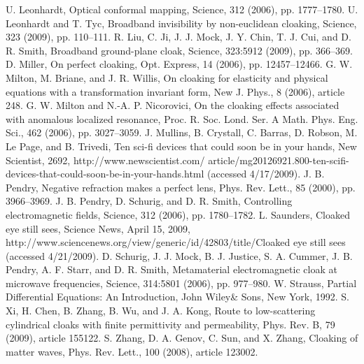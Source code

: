 \documentclass[a4paper, 12pt]{article}
\begin{document}
\begin{thebibliography}{99}
U. Leonhardt, Optical conformal mapping, Science, 312 (2006), 
pp. 1777–1780.
U. Leonhardt and T. Tyc, Broadband invisibility by non-euclidean cloaking,
Science, 323 (2009), pp. 110–111.
R. Liu, C. Ji, J. J. Mock, J. Y. Chin, T. J. Cui, and D. R. Smith, 
Broadband ground-plane cloak, Science, 323:5912 (2009), pp. 366–369.
D. Miller, On perfect cloaking, Opt. Express, 14 (2006), pp. 12457–12466.
G. W. Milton, M. Briane, and J. R. Willis, On cloaking for elasticity and 
physical equations with a transformation invariant form, New J. Phys., 8 (2006), 
article 248.
G. W. Milton and N.-A. P. Nicorovici, On the cloaking effects associated 
with anomalous localized resonance, Proc. R. Soc. Lond. Ser. A Math. Phys. Eng. Sci., 
462 (2006), pp. 3027–3059.
J. Mullins, B. Crystall, C. Barras, D. Robson, M. Le Page, and B. Trivedi, 
Ten sci-fi devices that could soon be in your hands, New Scientist, 2692, 
http://www.newscientist.com/
article/mg20126921.800-ten-scifi-devices-that-could-soon-be-in-your-hands.html 
(accessed 4/17/2009).
J. B. Pendry, Negative refraction makes a perfect lens, Phys. Rev. Lett., 
85 (2000), pp. 3966–3969.
J. B. Pendry, D. Schurig, and D. R. Smith, Controlling electromagnetic 
fields, Science, 312 (2006), pp. 1780–1782.
L. Saunders, Cloaked eye still sees, Science News, April 15, 2009, 
http://www.sciencenews.org/view/generic/id/42803/title/Cloaked eye still sees 
(accessed 4/21/2009).
D. Schurig, J. J. Mock, B. J. Justice, S. A. Cummer, J. B. Pendry, A. F. 
Starr, and D. R. Smith, Metamaterial electromagnetic cloak at microwave frequencies, 
Science, 314:5801 (2006), pp. 977–980.
W. Strauss, Partial Differential Equations: An Introduction, John Wiley\& 
Sons, New York, 1992.
S. Xi, H. Chen, B. Zhang, B. Wu, and J. A. Kong, Route to low-scattering 
cylindrical cloaks with finite permittivity and permeability, Phys. Rev. B, 79 (2009),
article 155122.
S. Zhang, D. A. Genov, C. Sun, and X. Zhang, Cloaking of matter waves, 
Phys. Rev. Lett., 100 (2008), article 123002.
\end{thebibliography}
\end{document}
